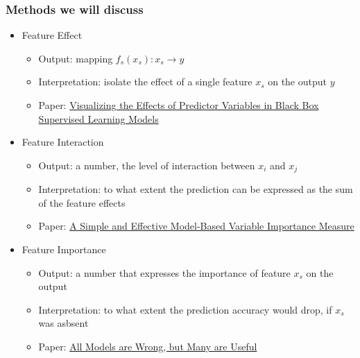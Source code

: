 \begin{frame}
  \frametitle{Methods we will discuss}

  \begin{itemize}
  \item Feature Effect
    \begin{itemize}
      \item Output: mapping \(f_s(x_s): x_s \rightarrow y\)
      \item Interpretation: isolate the effect of a single feature \(x_s\) on the output \(y\)
      \item Paper: \href{https://arxiv.org/abs/1612.08468}{Visualizing the Effects of Predictor Variables in Black Box Supervised Learning Models}
    \end{itemize}
  \item Feature Interaction
    \begin{itemize}
    \item Output: a number, the level of interaction between \(x_i\) and \(x_j\)
    \item Interpretation: to what extent the prediction can be expressed as the sum of the feature effects
      \item Paper: \href{https://arxiv.org/abs/1805.04755}{A Simple and Effective Model-Based Variable Importance Measure}
    \end{itemize}
  \item Feature Importance
    \begin{itemize}
      \item Output: a number that expresses the importance of feature \(x_s\) on the output
      \item Interpretation: to what extent the prediction accuracy would drop, if \(x_s\) was asbsent
        \item Paper: \href{https://arxiv.org/abs/1801.01489}{All Models are Wrong, but Many are Useful}
    \end{itemize}

  \end{itemize}

\end{frame}
